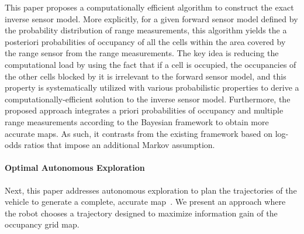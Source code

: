 \documentclass[smallextended]{svjour3}       %
\begin{document}




This paper proposes a computationally efficient algorithm to construct the exact inverse sensor model. More explicitly, for a given forward sensor model defined by the probability distribution of range measurements, this algorithm yields the a posteriori probabilities of occupancy of all the cells within the area covered by the range sensor from the range measurements. The key idea is reducing the computational load by using the fact that if a cell is occupied, the occupancies of the other cells blocked by it is irrelevant to the forward sensor model, and this property is systematically utilized with various probabilistic properties to derive a computationally-efficient solution to the inverse sensor model. Furthermore, the proposed approach integrates a priori probabilities of occupancy and multiple range measurements according to the Bayesian framework to obtain more accurate maps. As such, it contrasts from the existing framework based on log-odds ratios that impose an additional Markov assumption. 

\paragraph{Optimal Autonomous Exploration}

Next, this paper addresses autonomous exploration to plan the trajectories of the vehicle to generate a complete, accurate map~\cite{Yam97}. We present an approach where the robot chooses a trajectory designed to maximize information gain of the occupancy grid map.

\end{document}
